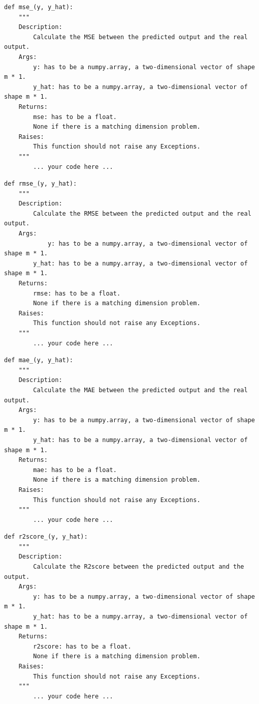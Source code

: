 \documentclass{42-en}
\begin{document}
\begin{verbatim}
def mse_(y, y_hat):
	"""
	Description:
		Calculate the MSE between the predicted output and the real output.
	Args:
        y: has to be a numpy.array, a two-dimensional vector of shape m * 1.
        y_hat: has to be a numpy.array, a two-dimensional vector of shape m * 1.		
	Returns:
		mse: has to be a float.
		None if there is a matching dimension problem.
	Raises:
		This function should not raise any Exceptions.
	"""
		... your code here ...
\end{verbatim}
\begin{verbatim}
def rmse_(y, y_hat):
	"""
	Description:
		Calculate the RMSE between the predicted output and the real output.
	Args:
	        y: has to be a numpy.array, a two-dimensional vector of shape m * 1.
        y_hat: has to be a numpy.array, a two-dimensional vector of shape m * 1.		
	Returns:
		rmse: has to be a float.
		None if there is a matching dimension problem.
	Raises:
		This function should not raise any Exceptions.
	"""
		... your code here ...
\end{verbatim}
\begin{verbatim}
def mae_(y, y_hat):
	"""
	Description:
		Calculate the MAE between the predicted output and the real output.
	Args:
        y: has to be a numpy.array, a two-dimensional vector of shape m * 1.
        y_hat: has to be a numpy.array, a two-dimensional vector of shape m * 1.		
	Returns:
		mae: has to be a float.
		None if there is a matching dimension problem.
	Raises:
		This function should not raise any Exceptions.
	"""
		... your code here ...
\end{verbatim}
\begin{verbatim}
def r2score_(y, y_hat):
	"""
	Description:
		Calculate the R2score between the predicted output and the output.
	Args:
        y: has to be a numpy.array, a two-dimensional vector of shape m * 1.
        y_hat: has to be a numpy.array, a two-dimensional vector of shape m * 1.		
	Returns:
		r2score: has to be a float.
		None if there is a matching dimension problem.
	Raises:
		This function should not raise any Exceptions.
	"""
		... your code here ...
\end{verbatim}

\end{document}
